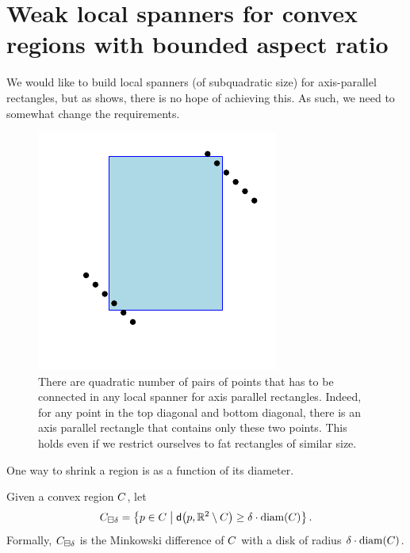 \documentclass[12pt]{article}%
\begin{document}
\section{Weak local spanners for convex regions %
   with bounded aspect ratio}

We would like to build local spanners (of subquadratic size) for
axis-parallel rectangles, but as  shows, there
is no hope of achieving this. As such, we need to somewhat change the
requirements.

\begin{figure}
    \centerline{\includegraphics{figs/local_rectangles}}
    \caption{There are quadratic number of pairs of points that has to
       be connected in any local spanner for axis parallel
       rectangles. Indeed, for any point in the top diagonal and
       bottom diagonal, there is an axis parallel rectangle that
       contains only these two points. This holds even if we restrict
       ourselves to fat rectangles of similar size.}
\end{figure}




One way to shrink a region is as a function of its diameter.

\begin{defn}
    Given a convex region $C$, let
    \begin{equation*}
        \shrinkDY{\body}{\delta}%
        =%
        \Set{ \pa \in \body }{ \dsY{\pa}{ \Re^2 \setminus \body} \geq \delta \cdot
           \diameterX{\body}}.        
    \end{equation*}
    Formally, $C_{\boxminus \delta}$ is the Minkowski difference
    of $C$ with a disk of radius $\delta \cdot \diameterX{\body}$.
\end{defn}
\end{document}
